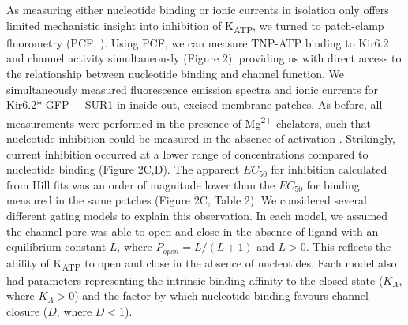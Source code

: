 \documentclass[9pt,lineno, onehalfspacing]{elife_modified}
\begin{document}
As measuring either nucleotide binding or ionic currents in isolation only offers limited mechanistic insight into inhibition of K\textsubscript{ATP}, we turned to patch-clamp fluorometry (PCF, \cite{RN51, RN114}).
Using PCF, we can measure TNP-ATP binding to Kir6.2 and channel activity simultaneously (Figure 2), providing us with direct access to the relationship between nucleotide binding and channel function.
We simultaneously measured fluorescence emission spectra and ionic currents for Kir6.2*-GFP + SUR1 in inside-out, excised membrane patches.
As before, all measurements were performed in the presence of Mg\textsuperscript{2+} chelators, such that nucleotide inhibition could be measured in the absence of activation \citep{RN10, RN82}.
Strikingly, current inhibition occurred at a lower range of concentrations compared to nucleotide binding (Figure 2C,D). The apparent $EC_{50}$ for inhibition calculated from Hill fits was an order of magnitude lower than the $EC_{50}$ for binding measured in the same patches (Figure 2C, Table 2).
We considered several different gating models to explain this observation.
In each model, we assumed the channel pore was able to open and close in the absence of ligand with an equilibrium constant $L$, where $P_{open} = L/(L + 1)$ and $L > 0$.
This reflects the ability of K\textsubscript{ATP} to open and close in the absence of nucleotides.
Each model also had parameters representing the intrinsic binding affinity to the closed state ($K_A$, where $K_A > 0$) and the factor by which nucleotide binding favours channel closure ($D$, where $D < 1$).
\end{document}

